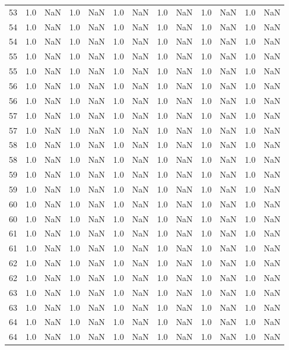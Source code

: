 \begin{tabular}{lrrrrrrrrrrrr}
53 & 1.0 & NaN & 1.0 & NaN & 1.0 & NaN & 1.0 & NaN & 1.0 & NaN & 1.0 & NaN \\
54 & 1.0 & NaN & 1.0 & NaN & 1.0 & NaN & 1.0 & NaN & 1.0 & NaN & 1.0 & NaN \\
54 & 1.0 & NaN & 1.0 & NaN & 1.0 & NaN & 1.0 & NaN & 1.0 & NaN & 1.0 & NaN \\
55 & 1.0 & NaN & 1.0 & NaN & 1.0 & NaN & 1.0 & NaN & 1.0 & NaN & 1.0 & NaN \\
55 & 1.0 & NaN & 1.0 & NaN & 1.0 & NaN & 1.0 & NaN & 1.0 & NaN & 1.0 & NaN \\
56 & 1.0 & NaN & 1.0 & NaN & 1.0 & NaN & 1.0 & NaN & 1.0 & NaN & 1.0 & NaN \\
56 & 1.0 & NaN & 1.0 & NaN & 1.0 & NaN & 1.0 & NaN & 1.0 & NaN & 1.0 & NaN \\
57 & 1.0 & NaN & 1.0 & NaN & 1.0 & NaN & 1.0 & NaN & 1.0 & NaN & 1.0 & NaN \\
57 & 1.0 & NaN & 1.0 & NaN & 1.0 & NaN & 1.0 & NaN & 1.0 & NaN & 1.0 & NaN \\
58 & 1.0 & NaN & 1.0 & NaN & 1.0 & NaN & 1.0 & NaN & 1.0 & NaN & 1.0 & NaN \\
58 & 1.0 & NaN & 1.0 & NaN & 1.0 & NaN & 1.0 & NaN & 1.0 & NaN & 1.0 & NaN \\
59 & 1.0 & NaN & 1.0 & NaN & 1.0 & NaN & 1.0 & NaN & 1.0 & NaN & 1.0 & NaN \\
59 & 1.0 & NaN & 1.0 & NaN & 1.0 & NaN & 1.0 & NaN & 1.0 & NaN & 1.0 & NaN \\
60 & 1.0 & NaN & 1.0 & NaN & 1.0 & NaN & 1.0 & NaN & 1.0 & NaN & 1.0 & NaN \\
60 & 1.0 & NaN & 1.0 & NaN & 1.0 & NaN & 1.0 & NaN & 1.0 & NaN & 1.0 & NaN \\
61 & 1.0 & NaN & 1.0 & NaN & 1.0 & NaN & 1.0 & NaN & 1.0 & NaN & 1.0 & NaN \\
61 & 1.0 & NaN & 1.0 & NaN & 1.0 & NaN & 1.0 & NaN & 1.0 & NaN & 1.0 & NaN \\
62 & 1.0 & NaN & 1.0 & NaN & 1.0 & NaN & 1.0 & NaN & 1.0 & NaN & 1.0 & NaN \\
62 & 1.0 & NaN & 1.0 & NaN & 1.0 & NaN & 1.0 & NaN & 1.0 & NaN & 1.0 & NaN \\
63 & 1.0 & NaN & 1.0 & NaN & 1.0 & NaN & 1.0 & NaN & 1.0 & NaN & 1.0 & NaN \\
63 & 1.0 & NaN & 1.0 & NaN & 1.0 & NaN & 1.0 & NaN & 1.0 & NaN & 1.0 & NaN \\
64 & 1.0 & NaN & 1.0 & NaN & 1.0 & NaN & 1.0 & NaN & 1.0 & NaN & 1.0 & NaN \\
64 & 1.0 & NaN & 1.0 & NaN & 1.0 & NaN & 1.0 & NaN & 1.0 & NaN & 1.0 & NaN \\

\end{tabular}
